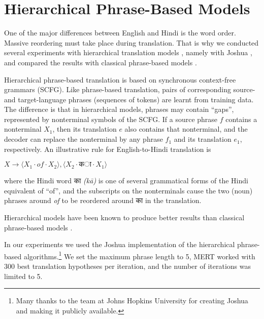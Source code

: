 \documentclass[11pt]{article}
\newcommand{\hindi}[1]{{\hi #1}}
\begin{document}
\section{Hierarchical Phrase-Based Models}
\label{joshua}

One of the major differences between English and Hindi is the word order.
Massive reordering must take place during translation.
That is why we conducted several experiments with hierarchical
translation models \citep{chiang:2007}, namely with Joshua \citep{joshua:2009},
and compared the results with classical phrase-based models \citep[Moses, ][]{moses:2007}.

Hierarchical phrase-based translation is based on synchronous context-free grammars (SCFG).
Like phrase-based translation, pairs of corresponding source- and target-language phrases
(sequences of tokens) are learnt from training data. The difference is that in hierarchical
models, phrases may contain ``gaps'', represented by nonterminal symbols of the SCFG.
If a source phrase $f$ contains a nonterminal $X_1$, then its translation $e$ also
contains that nonterminal, and the decoder can replace the nonterminal by any phrase $f_1$
and its translation $e_1$, respectively. An illustrative rule for English-to-Hindi translation is


\begin{center}
$X \rightarrow \langle X_1\cdot of\cdot X_2\rangle , \langle X_2\cdot \mathsf{का} \cdot X_1 \rangle$
\end{center}

where the Hindi word \hindi{का} \textit{(kā)} is one of several grammatical forms of the Hindi equivalent
of ``of'', and the subscripts on the nonterminals cause the two (noun) phrases around \textit{of}
to be reordered around \hindi{का} in the translation.

Hierarchical models have been known to produce better results than classical phrase-based
models \citep{chiang:etal:2005}.

In our experiments we used the Joshua implementation of the hierarchical phrase-based
algorithms.\footnote{Many thanks to the team at Johns Hopkins University for creating
Joshua and making it publicly available.} We set the maximum phrase length to 5,
MERT worked with 300 best translation hypotheses per iteration, and the number of
iterations was limited to 5.
\end{document}
